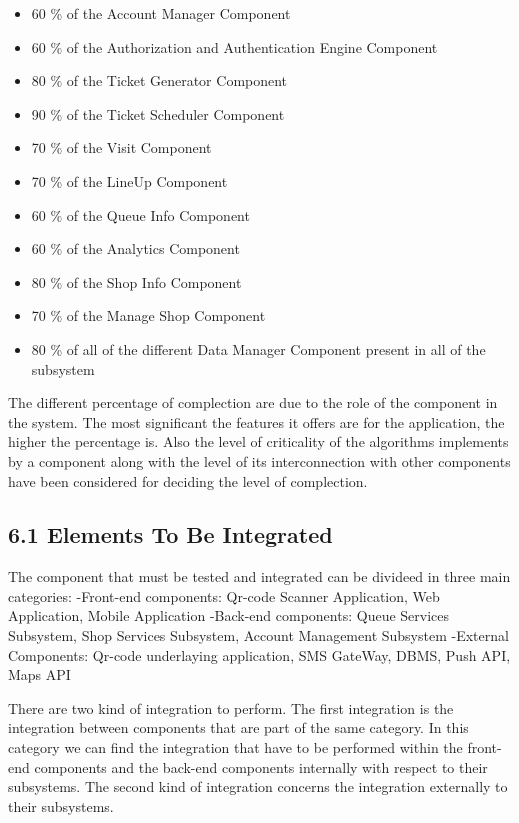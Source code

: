 \begin{itemize}
        \begin{itemize}
            \item 60 \% of the Account Manager Component
            \item 60 \% of the Authorization and Authentication Engine Component
            \item 80 \% of the Ticket Generator 
            Component
            \item 90 \% of the Ticket Scheduler Component
            \item 70 \% of the Visit Component
            \item 70 \% of the LineUp Component
            \item  60 \% of the Queue Info Component
            \item  60 \% of the Analytics Component
            \item 80 \% of the Shop Info Component
            \item 70 \% of the Manage Shop Component
            \item 80 \% of all of the different Data Manager Component present in all of the subsystem
        \end{itemize}
        The different percentage of complection are due to the role of the component in the system. The most significant the features it offers are for the application, the higher the percentage is. Also the level of criticality of the algorithms implements by a component along with the level of its interconnection with other components have been considered for deciding the level of complection.
\end{itemize}


\subsection{6.1 Elements To Be Integrated}
\label{subsect: entrycriteria}
The component that must be tested and integrated can be divideed in three main categories:
-Front-end components: Qr-code Scanner Application, Web Application, Mobile Application 
-Back-end components: Queue Services Subsystem, Shop Services Subsystem, Account Management Subsystem
-External Components: Qr-code underlaying application, SMS GateWay, DBMS, Push API, Maps API

There are two kind of integration to perform. The first integration is the integration between components that are part of the same category.
In this category we can find the integration that have to be performed within the front-end components and the back-end components internally with respect to their subsystems.
The second kind of integration concerns the integration externally to their subsystems.

